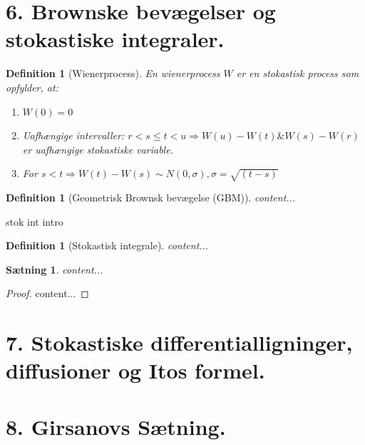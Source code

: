 \documentclass[12pt]{report}
\newtheorem{theorem}[lemma]{Sætning}
\newtheorem{definition}[lemma]{Definition}
\theoremstyle{break}
\newtheorem*{proof}{Bevis}
\theoremstyle{break}
\newcommand{\1}{\mathds{1}}
\begin{document}
\newpage

\section*{6. Brownske bevægelser og stokastiske integraler.}
\begin{definition}[Wienerprocess]
	En wienerprocess $W$ er en stokastisk process som opfylder, at:
	\begin{enumerate}
		\item $W(0)=0$
		\item Uafhængige intervaller: $r<s\leq t < u\Rightarrow W(u)-W(t) \& W(s)-W(r)$ er uafhængige stokastiske variable.
		\item For $s<t \Rightarrow W(t)-W(s)\sim N(0,\sigma), \sigma=\sqrt{(t-s)}$
	\end{enumerate}
\end{definition}
\begin{definition}[Geometrisk Brownsk bevægelse (GBM)]
	content...
\end{definition}
stok int intro
\begin{definition}[Stokastisk integrale]
	content...
\end{definition}
\begin{theorem}
	content...
\end{theorem}
\begin{proof}
	content...
\end{proof}
\newpage

\section*{7. Stokastiske differentialligninger, diffusioner og Itos formel.}


\newpage

\section*{8. Girsanovs Sætning.}
\end{document}
